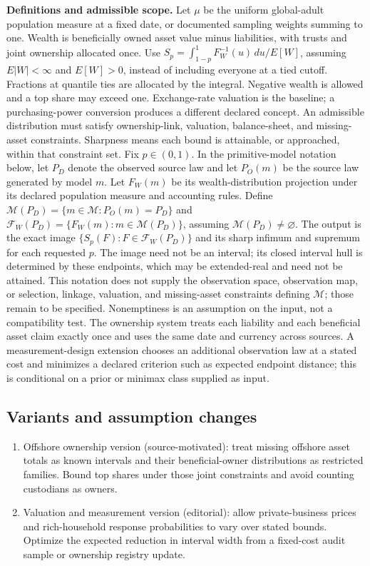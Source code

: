 \documentclass[11pt,a4paper]{article}
\begin{document}
\textbf{Definitions and admissible scope.} Let \(\mu\) be the uniform global-adult population measure at a fixed date, or documented sampling weights summing to one. Wealth is beneficially owned asset value minus liabilities, with trusts and joint ownership allocated once. Use \(S_p=\int_{1-p}^1F_W^{-1}(u)\,du/E[W]\), assuming \(E|W|<\infty\) and \(E[W]>0\), instead of including everyone at a tied cutoff. Fractions at quantile ties are allocated by the integral. Negative wealth is allowed and a top share may exceed one. Exchange-rate valuation is the baseline; a purchasing-power conversion produces a different declared concept. An admissible distribution must satisfy ownership-link, valuation, balance-sheet, and missing-asset constraints. Sharpness means each bound is attainable, or approached, within that constraint set. Fix \(p\in(0,1)\). In the primitive-model notation below, let \(P_D\) denote the observed source law and let \(P_O(m)\) be the source law generated by model \(m\). Let \(F_W(m)\) be its wealth-distribution projection under its declared population measure and accounting rules. Define \(\mathcal M(P_D)=\{m\in\mathcal M:P_O(m)=P_D\}\) and \(\mathcal F_W(P_D)=\{F_W(m):m\in\mathcal M(P_D)\}\), assuming \(\mathcal M(P_D)\ne\varnothing\). The output is the exact image \(\{S_p(F):F\in\mathcal F_W(P_D)\}\) and its sharp infimum and supremum for each requested \(p\). The image need not be an interval; its closed interval hull is determined by these endpoints, which may be extended-real and need not be attained. This notation does not supply the observation space, observation map, or selection, linkage, valuation, and missing-asset constraints defining \(\mathcal M\); those remain to be specified. Nonemptiness is an assumption on the input, not a compatibility test. The ownership system treats each liability and each beneficial asset claim exactly once and uses the same date and currency across sources. A measurement-design extension chooses an additional observation law at a stated cost and minimizes a declared criterion such as expected endpoint distance; this is conditional on a prior or minimax class supplied as input.
\subsection*{Variants and assumption changes}
\begin{enumerate}
\item Offshore ownership version (source-motivated): treat missing offshore asset totals as known intervals and their beneficial-owner distributions as restricted families. Bound top shares under those joint constraints and avoid counting custodians as owners.
\item Valuation and measurement version (editorial): allow private-business prices and rich-household response probabilities to vary over stated bounds. Optimize the expected reduction in interval width from a fixed-cost audit sample or ownership registry update.
\end{enumerate}
\end{document}
